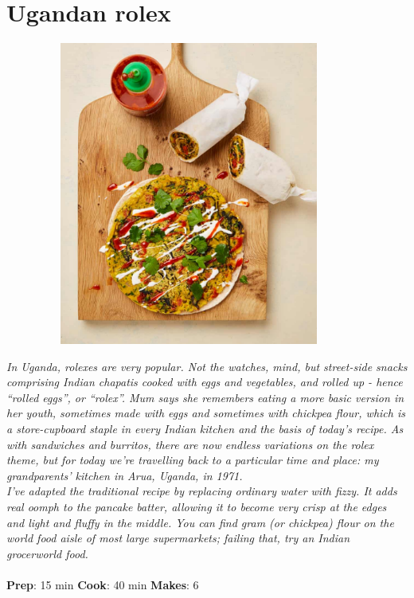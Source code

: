 \documentclass{book}
\begin{document}
\section{Ugandan rolex}
\begin{figure}
\centering\includegraphics[width=10cm,height=10cm,keepaspectratio]{Recipe_Pictures/Ugandan_rolex.png}
\end{figure}
\emph{In Uganda, rolexes are very popular. Not the watches, mind, but street-side snacks comprising Indian chapatis cooked with eggs and vegetables, and rolled up - hence “rolled eggs”, or “rolex”. Mum says she remembers eating a more basic version in her youth, sometimes made with eggs and sometimes with chickpea flour, which is a store-cupboard staple in every Indian kitchen and the basis of today’s recipe. As with sandwiches and burritos, there are now endless variations on the rolex theme, but for today we’re travelling back to a particular time and place: my grandparents’ kitchen in Arua, Uganda, in 1971.\\ 
I’ve adapted the traditional recipe by replacing ordinary water with fizzy. It adds real oomph to the pancake batter, allowing it to become very crisp at the edges and light and fluffy in the middle. You can find gram (or chickpea) flour on the world food aisle of most large supermarkets; failing that, try an Indian grocerworld food.}\\\\ 
\textbf{Prep}: 15 min
\textbf{Cook}: 40 min
\textbf{Makes}: 6
\end{document}

